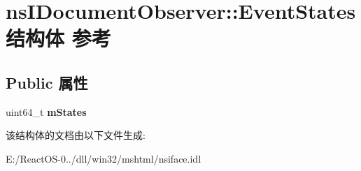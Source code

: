 \hypertarget{structns_i_document_observer_1_1_event_states}{}\section{ns\+I\+Document\+Observer\+:\+:Event\+States结构体 参考}
\label{structns_i_document_observer_1_1_event_states}
\subsection*{Public 属性}
\begin{DoxyCompactItemize}
\item 
\mbox{\label{structns_i_document_observer_1_1_event_states_af47949700fa265499ca395543c8fa622}} 
uint64\+\_\+t {\bfseries m\+States}
\end{DoxyCompactItemize}


该结构体的文档由以下文件生成\+:\begin{DoxyCompactItemize}
\item 
E\+:/\+React\+O\+S-\/0../dll/win32/mshtml/nsiface.\+idl\end{DoxyCompactItemize}
